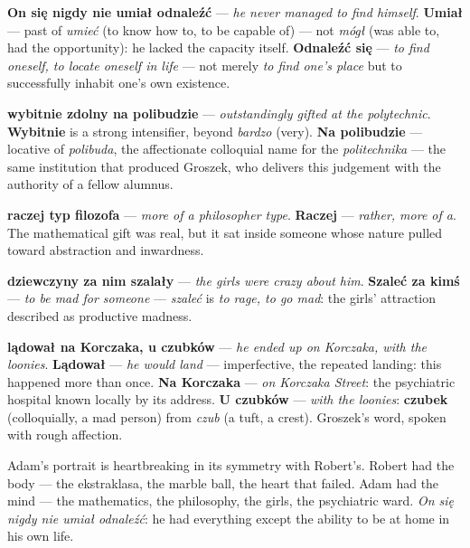 \textbf{On się nigdy nie umiał odnaleźć} --- \textit{he never managed
to find himself}. \textbf{Umiał} --- past of \textit{umieć} (to know
how to, to be capable of) --- not \textit{mógł} (was able to, had the
opportunity): he lacked the capacity itself. \textbf{Odnaleźć się}
--- \textit{to find oneself, to locate oneself in life} --- not merely
\textit{to find one's place} but to successfully inhabit one's own
existence.

\textbf{wybitnie zdolny na polibudzie} --- \textit{outstandingly gifted
at the polytechnic}. \textbf{Wybitnie} is a strong intensifier, beyond
\textit{bardzo} (very). \textbf{Na polibudzie} --- locative of
\textit{polibuda}, the affectionate colloquial name for the
\textit{politechnika} --- the same institution that produced Groszek,
who delivers this judgement with the authority of a fellow alumnus.

\textbf{raczej typ filozofa} --- \textit{more of a philosopher type}.
\textbf{Raczej} --- \textit{rather, more of a}. The mathematical gift
was real, but it sat inside someone whose nature pulled toward
abstraction and inwardness.

\textbf{dziewczyny za nim szalały} --- \textit{the girls were crazy
about him}. \textbf{Szaleć za kimś} --- \textit{to be mad for someone}
--- \textit{szaleć} is \textit{to rage, to go mad}: the girls'
attraction described as productive madness.

\textbf{lądował na Korczaka, u czubków} --- \textit{he ended up on
Korczaka, with the loonies}. \textbf{Lądował} --- \textit{he would
land} --- imperfective, the repeated landing: this happened more than
once. \textbf{Na Korczaka} --- \textit{on Korczaka Street}: the
psychiatric hospital known locally by its address. \textbf{U czubków}
--- \textit{with the loonies}: \textbf{czubek} (colloquially, a mad
person) from \textit{czub} (a tuft, a crest). Groszek's word, spoken
with rough affection.

Adam's portrait is heartbreaking in its symmetry with Robert's. Robert
had the body --- the ekstraklasa, the marble ball, the heart that
failed. Adam had the mind --- the mathematics, the philosophy, the
girls, the psychiatric ward. \textit{On się nigdy nie umiał odnaleźć}:
he had everything except the ability to be at home in his own life.



